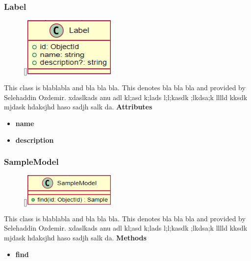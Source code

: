 \subsubsection{Label}
\begin{figure}
    \raisebox{0pt}[\dimexpr{}\baselineskip\relax]{\includegraphics[width=4.5cm]{classes/workspace-management/5.png}}
\end{figure} 
\par
This class is blablabla and bla bla bla. This denotes bla bla bla and provided by Selehaddin Ozdemir. xdaslkads anu adl kl;asd k;lads l;l;kasdk ;lkdsa;k lllld kksdk mjdask hdaksjhd haso sadjh salk da.
\newline
\newline
\textbf{Attributes}
\begin{itemize}
    \item \textbf{name}
    \item \textbf{description}
\end{itemize}

\subsubsection{SampleModel}
\begin{figure}
    \raisebox{0pt}[\dimexpr{}\baselineskip\relax]{\includegraphics[width=4.5cm]{classes/workspace-management/6.png}}
\end{figure} 
\par
This class is blablabla and bla bla bla. This denotes bla bla bla and provided by Selehaddin Ozdemir. xdaslkads anu adl kl;asd k;lads l;l;kasdk ;lkdsa;k lllld kksdk mjdask hdaksjhd haso sadjh salk da.
\newline
\newline
\textbf{Methods}
\begin{itemize}
    \item \textbf{find}
\end{itemize}

